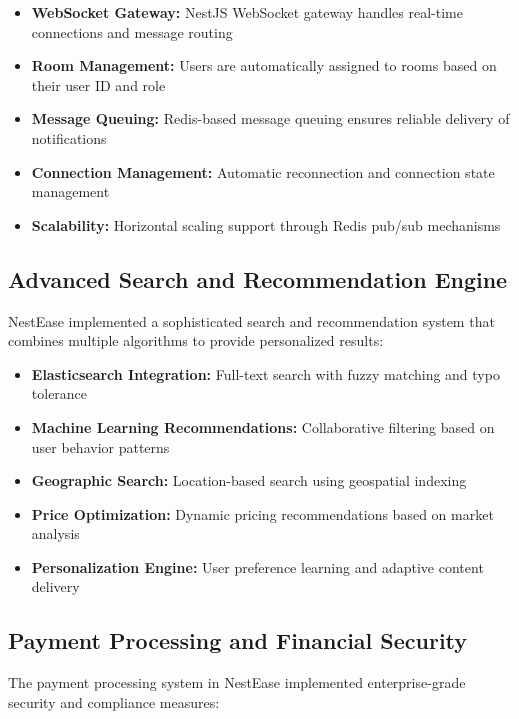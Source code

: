 \documentclass[conference]{IEEEtran}
\begin{document}
\begin{itemize}
    \item \textbf{WebSocket Gateway:} NestJS WebSocket gateway handles real-time connections and message routing
    \item \textbf{Room Management:} Users are automatically assigned to rooms based on their user ID and role
    \item \textbf{Message Queuing:} Redis-based message queuing ensures reliable delivery of notifications
    \item \textbf{Connection Management:} Automatic reconnection and connection state management
    \item \textbf{Scalability:} Horizontal scaling support through Redis pub/sub mechanisms
\end{itemize}

\subsection{Advanced Search and Recommendation Engine}
NestEase implemented a sophisticated search and recommendation system that combines multiple algorithms to provide personalized results:

\begin{itemize}
    \item \textbf{Elasticsearch Integration:} Full-text search with fuzzy matching and typo tolerance
    \item \textbf{Machine Learning Recommendations:} Collaborative filtering based on user behavior patterns
    \item \textbf{Geographic Search:} Location-based search using geospatial indexing
    \item \textbf{Price Optimization:} Dynamic pricing recommendations based on market analysis
    \item \textbf{Personalization Engine:} User preference learning and adaptive content delivery
\end{itemize}

\subsection{Payment Processing and Financial Security}
The payment processing system in NestEase implemented enterprise-grade security and compliance measures:
\end{document}
